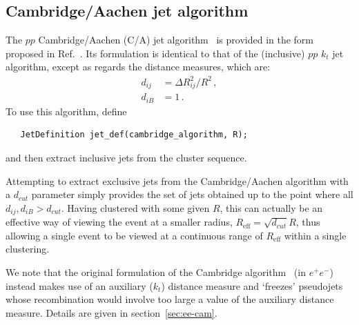 \documentclass[12pt,a4]{article}
\begin{document}
\subsection{Cambridge/Aachen jet algorithm}

The $pp$ Cambridge/Aachen (C/A) jet
algorithm~\cite{CamOrig,CamWobisch} is provided in the form proposed
in Ref.~\cite{CamWobisch}.
%
Its formulation is identical to that of the (inclusive) $pp$ $k_t$ jet
algorithm, except as regards the distance measures, which are:
\begin{subequations}
  \label{eq:dij_cam}
  \begin{align}
    d_{ij} &= \Delta R_{ij}^2 / R^2\,,\\
    d_{iB} &= 1\,.
  \end{align}
\end{subequations}
To use this algorithm, define 
\begin{lstlisting}
   JetDefinition jet_def(cambridge_algorithm, R);
\end{lstlisting}
and then extract inclusive jets from the cluster sequence.

Attempting to extract exclusive jets from the Cambridge/Aachen
algorithm with a
$d_{cut}$ parameter simply provides the set of jets obtained up to the
point where all $d_{ij},d_{iB} > d_{cut}$. Having clustered with some
given $R$, this can actually be an effective way of viewing the event
at a smaller radius, $R_\text{eff} = \sqrt{d_{cut}} R$, thus allowing a
single event to be viewed at a continuous range of $R_\text{eff}$ within a
single clustering.

We note that the original formulation of the Cambridge
algorithm~\cite{CamOrig} (in $e^+e^-$) instead makes use of an
auxiliary ($k_t$) distance measure and `freezes' pseudojets whose
recombination would involve too large a value of the auxiliary
distance measure. Details are given in section~\ref{sec:ee-cam}.


\end{document}
